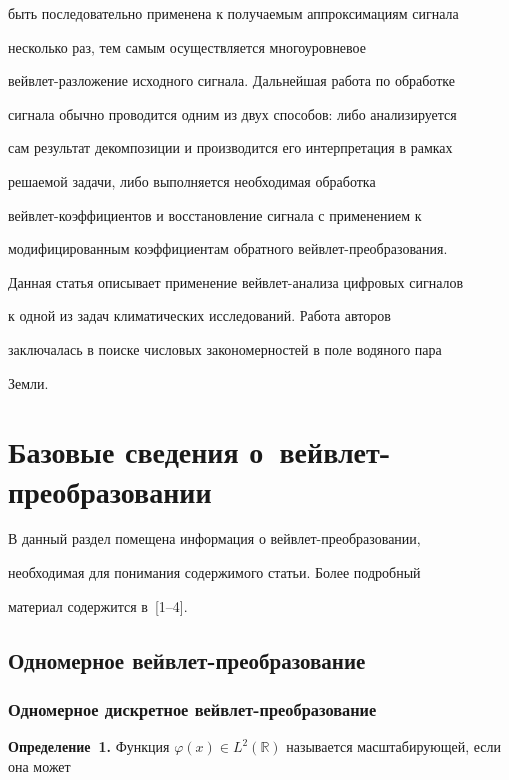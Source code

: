 быть последовательно применена к получаемым аппроксимациям сигнала

несколько раз, тем самым осуществляется многоуровневое

вейвлет-разложение исходного сигнала. Дальнейшая работа по обработке

сигнала обычно проводится одним из двух способов: либо анализируется

сам результат декомпозиции и производится его интерпретация в рамках

ре\-ша\-емой задачи, либо выполняется необходимая обработка

вейвлет-коэффициентов и восстановление сигнала с применением к

модифицированным коэффициентам обратного вейвлет-преобразования.



Данная статья описывает применение вейвлет-анализа цифровых сигналов

к одной из задач климатических исследований. Работа авторов

заключалась в поиске числовых закономерностей в поле водяного пара

Земли.





\section{Базовые сведения о~вейвлет-преобразовании}



В данный раздел помещена информация о вейвлет-преобразовании,

необходимая для понимания содержимого статьи. Более подробный

материал содержится в~[1--4].



\subsection{Одномерное вейвлет-преобразование}



\subsubsection{Одномерное дискретное вейвлет-преобразование}



\noindent

\textbf{Определение~1.} Функция $\varphi(x) \in L^2(\mathbb{R})$ называется масштабирующей, если она может

